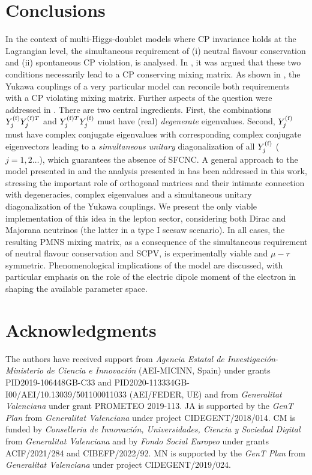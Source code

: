 \documentclass[12pt,a4paper]{article}
\begin{document}
\section{Conclusions\label{SEC:Conc}}
In the context of multi-Higgs-doublet models where CP invariance holds at the Lagrangian level, the simultaneous requirement of (i) neutral flavour conservation and (ii) spontaneous CP violation, is analysed. In \cite{Branco:1979pv}, it was argued that these two conditions necessarily lead to a CP conserving mixing matrix. As shown in \cite{Ecker:1987md}, the Yukawa couplings of a very particular model can reconcile both requirements with a CP violating mixing matrix. Further aspects of the question were addressed in \cite{Gronau:1987xz}. There are two central ingredients. First, the combinations $Y_{j}^{\rm (f)}Y_{j}^{{\rm (f)}T}$ and $Y_{j}^{{\rm (f)}T}Y_{j}^{\rm (f)}$ must have (real) \emph{degenerate} eigenvalues. Second, $Y_{j}^{\rm (f)}$ must have complex conjugate eigenvalues with corresponding complex conjugate eigenvectors leading to a \emph{simultaneous unitary} diagonalization of all $Y_{j}^{\rm (f)}$ ($j=1, 2\ldots$), which guarantees the absence of SFCNC. A general approach to the model presented in \cite{Ecker:1987md} and the analysis presented in \cite{Gronau:1987xz} has been addressed in this work, stressing the important role of orthogonal matrices and their intimate connection with degeneracies, complex eigenvalues and a simultaneous unitary diagonalization of the Yukawa couplings. We present the only viable implementation of this idea in the lepton sector, considering both Dirac and Majorana neutrinos (the latter in a type I seesaw scenario). In all cases, the resulting PMNS mixing matrix, as a consequence of the simultaneous requirement of neutral flavour conservation and SCPV, is experimentally viable and $\mu-\tau$ symmetric. Phenomenological implications of the model are discussed, with particular emphasis on the role of the electric dipole moment of the electron in shaping the available parameter space.


\section*{Acknowledgments\label{SEC:Ack}}
The authors have received support from \textit{Agencia Estatal de Investigaci\'on}-\textit{Ministerio de Ciencia e Innovaci\'on} (AEI-MICINN, Spain) under grants PID2019-106448GB-C33 and PID2020-113334GB-I00/AEI/10.13039/501100011033 (AEI/FEDER, UE) and from \textit{Generalitat Valenciana} under grant PROMETEO 2019-113. JA is supported by the \textit{GenT Plan} from \textit{Generalitat Valenciana} under project CIDEGENT/2018/014. CM is funded by \textit{Conselleria de Innovación, Universidades, Ciencia y Sociedad Digital} from \textit{Generalitat Valenciana} and by \textit{Fondo Social Europeo} under grants ACIF/2021/284 and CIBEFP/2022/92. MN is supported by the \textit{GenT Plan} from \textit{Generalitat Valenciana} under project CIDEGENT/2019/024.
\end{document}
